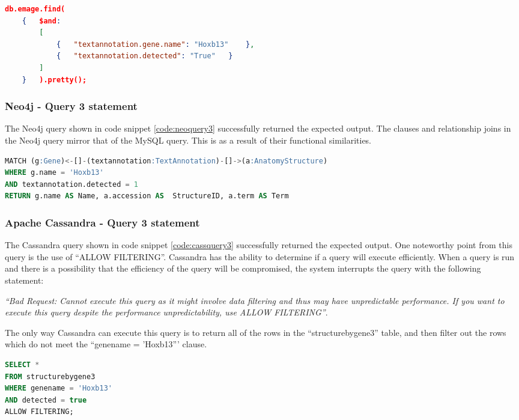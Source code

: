 \begin{lstlisting}[language=json, caption=MongoDB query 3 statement. Where is gene X expressed?., label=code:mongoquery3]
db.emage.find(
	{	$and:
		[
			{	"textannotation.gene.name": "Hoxb13"	},
			{	"textannotation.detected": "True"	}
		]
	}	).pretty();
\end{lstlisting}

\subsubsection*{Neo4j - Query 3 statement}\label{neoquery3statement}
The Neo4j query shown in code snippet \ref{code:neoquery3} successfully returned the expected output. The clauses and relationship joins in the Neo4j query mirror that of the MySQL query. This is as a result of their functional similarities.

\begin{lstlisting}[language=SQL, caption=Neo4j query 3 statement. Where is gene X expressed?., label=code:neoquery3]
MATCH (g:Gene)<-[]-(textannotation:TextAnnotation)-[]->(a:AnatomyStructure)
WHERE g.name = 'Hoxb13'
AND textannotation.detected = 1
RETURN g.name AS Name, a.accession AS  StructureID, a.term AS Term
\end{lstlisting}

\subsubsection*{Apache Cassandra - Query 3 statement}\label{cassquery3statement}
The Cassandra query shown in code snippet \ref{code:cassquery3} successfully returned the expected output. One noteworthy point from this query is the use of ``ALLOW FILTERING''. Cassandra has the ability to determine if a query will execute efficiently. When a query is run and there is a possibility that the efficiency of the query will be compromised, the system interrupts the query with the following statement:\\[1.5em]
\begin{addmargin}[2.5em]{2.5em}
\textit{``Bad Request: Cannot execute this query as it might involve data filtering and thus may have unpredictable performance. If you want to execute this query despite the performance unpredictability, use ALLOW FILTERING''}.
\end{addmargin}
\parindent 0pt
The only way Cassandra can execute this query is to return all of the rows in the ``structurebygene3'' table, and then filter out the rows which do not meet the ``genename = 'Hoxb13''' clause. 
\parindent 15pt
\begin{lstlisting}[language=SQL, caption=Cassandra query 3 statement. Where is gene X expressed?., label=code:cassquery3]
SELECT *
FROM structurebygene3
WHERE genename = 'Hoxb13'
AND detected = true
ALLOW FILTERING;
\end{lstlisting}

